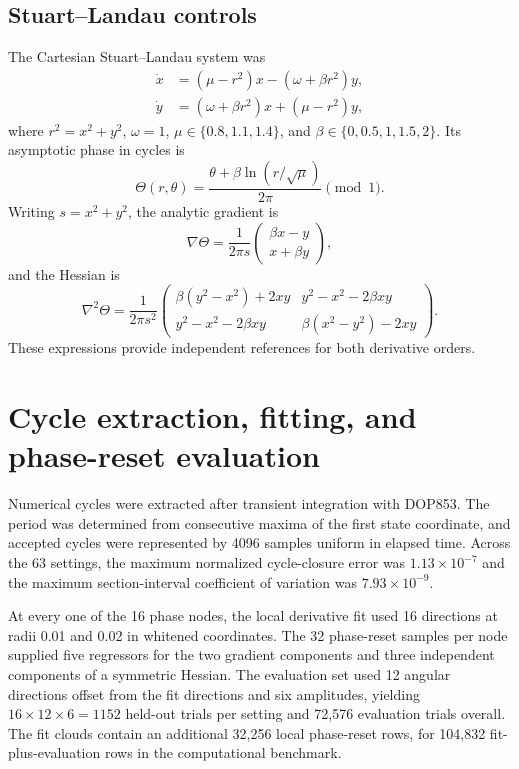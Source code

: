 \documentclass[11pt]{article}
\begin{document}
\subsection{Stuart--Landau controls}
The Cartesian Stuart--Landau system was
\begin{align}
\dot x &= (\mu-r^2)x-(\omega+\beta r^2)y,\\
\dot y &= (\omega+\beta r^2)x+(\mu-r^2)y,
\end{align}
where $r^2=x^2+y^2$, $\omega=1$, $\mu\in\{0.8,1.1,1.4\}$, and $\beta\in\{0,0.5,1,1.5,2\}$. Its asymptotic phase in cycles is
\begin{equation}
\Theta(r,\theta)=\frac{\theta+\beta\ln(r/\sqrt{\mu})}{2\pi}\pmod 1.
\end{equation}
Writing $s=x^2+y^2$, the analytic gradient is
\begin{equation}
\nabla\Theta=\frac{1}{2\pi s}
\begin{pmatrix}
\beta x-y\\
x+\beta y
\end{pmatrix},
\end{equation}
and the Hessian is
\begin{equation}
\nabla^2\Theta=\frac{1}{2\pi s^2}
\begin{pmatrix}
\beta(y^2-x^2)+2xy & y^2-x^2-2\beta xy\\
y^2-x^2-2\beta xy & \beta(x^2-y^2)-2xy
\end{pmatrix}.
\end{equation}
These expressions provide independent references for both derivative orders.

\section{Cycle extraction, fitting, and phase-reset evaluation}
Numerical cycles were extracted after transient integration with DOP853. The period was determined from consecutive maxima of the first state coordinate, and accepted cycles were represented by 4096 samples uniform in elapsed time. Across the 63 settings, the maximum normalized cycle-closure error was $1.13\times10^{-7}$ and the maximum section-interval coefficient of variation was $7.93\times10^{-9}$.

At every one of the 16 phase nodes, the local derivative fit used 16 directions at radii 0.01 and 0.02 in whitened coordinates. The 32 phase-reset samples per node supplied five regressors for the two gradient components and three independent components of a symmetric Hessian. The evaluation set used 12 angular directions offset from the fit directions and six amplitudes, yielding $16\times12\times6=1152$ held-out trials per setting and 72,576 evaluation trials overall. The fit clouds contain an additional 32,256 local phase-reset rows, for 104,832 fit-plus-evaluation rows in the computational benchmark.
\end{document}
